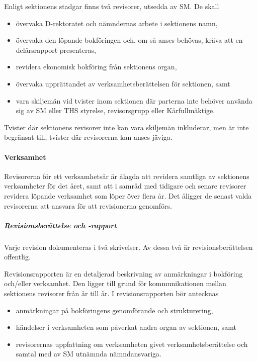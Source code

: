 \documentclass{dgovdoc}
\begin{document}
Enligt sektionens stadgar finns två revisorer, utsedda av SM. De skall

\begin{itemize}
  \item övervaka D-rektoratet och nämndernas arbete i sektionens namn,
  \item övervaka den löpande bokföringen och, om så anses behövas, kräva att en
    delårsrapport presenteras,
  \item revidera ekonomisk bokföring från sektionens organ,
  \item övervaka upprättandet av verksamhetsberättelsen för sektionen, samt
  \item vara skiljemän vid tvister inom sektionen där parterna inte behöver
    använda sig av SM eller THS styrelse, revisorsgrupp eller Kårfullmäktige.
\end{itemize}

Tvister där sektionens revisorer inte kan vara skiljemän inkluderar, men är
inte begränsat till, tvister där revisorerna kan anses jäviga.

\paragraph{Verksamhet}

Revisorerna för ett verksamhetsår är ålagda att revidera samtliga av sektionens
verksamheter för det året, samt att i samråd med tidigare och senare revisorer
revidera löpande verksamhet som löper över flera år. Det åligger de senast
valda revisorerna att ansvara för att revisionerna genomförs.

\subparagraph{Revisionsberättelse och -rapport}

Varje revision dokumenteras i två skrivelser. Av dessa två är
revisionsberättelsen offentlig.

Revisionsrapporten är en detaljerad beskrivning av anmärkningar i bokföring
och/eller verksamhet. Den ligger till grund för kommunikationen mellan
sektionens revisorer från år till år. I
revisionsrapporten bör antecknas

\begin{itemize}
  \item anmärkningar på bokföringens genomförande och strukturering,
  \item händelser i verksamheten som påverkat andra organ av sektionen, samt
  \item revisorernas uppfattning om verksamheten givet verksamhetsberättelse
    och samtal med av SM utnämnda nämndansvariga.
\end{itemize}
\end{document}
